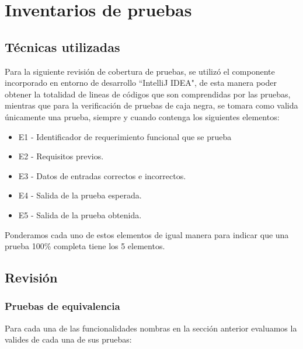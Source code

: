 \section{Inventarios de pruebas}

\subsection{Técnicas utilizadas}
Para la siguiente revisión de cobertura de pruebas, se utilizó el componente incorporado en entorno de desarrollo ``IntelliJ IDEA", de esta manera poder obtener la totalidad de lineas de códigos que son comprendidas por las pruebas, mientras que para la verificación de pruebas de caja negra, se tomara como valida únicamente una prueba, siempre y cuando contenga los siguientes elementos:
\begin{itemize}
    \item E1 - Identificador de requerimiento funcional que se prueba
    \item E2 - Requisitos previos.
    \item E3 - Datos de entradas correctos e incorrectos.
    \item E4 - Salida de la prueba esperada.
    \item E5 - Salida de la prueba obtenida.
\end{itemize}

Ponderamos cada uno de estos elementos de igual manera para indicar que una prueba 100\% completa tiene los 5 elementos.

\subsection{Revisión}

\subsubsection{Pruebas de equivalencia}
Para cada una de las funcionalidades nombras en la sección anterior evaluamos la valides de cada una de sus pruebas:



